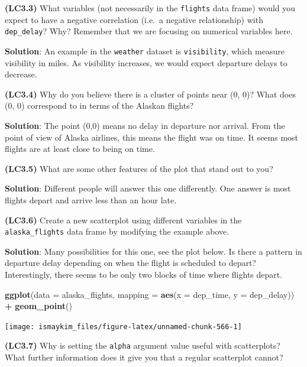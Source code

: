 \documentclass[12pt, krantz2,]{krantz}
\makeatletter
\newenvironment{Shaded}{\begin{snugshade}}{\end{snugshade}}
\newcommand{\DataTypeTok}[1]{\textcolor[rgb]{0.27,0.27,0.27}{#1}}
\newcommand{\KeywordTok}[1]{\textcolor[rgb]{0.27,0.27,0.27}{\textbf{#1}}}
\newcommand{\NormalTok}[1]{#1}
\newcommand{\OperatorTok}[1]{\textcolor[rgb]{0.43,0.43,0.43}{\textbf{#1}}}
\newcommand{\StringTok}[1]{\textcolor[rgb]{0.5,0.5,0.5}{#1}}
\newenvironment{kframe}{%
\medskip{}
\setlength{\fboxsep}{.8em}
 \def\at@end@of@kframe{}%
 \ifinner\ifhmode%
  \def\at@end@of@kframe{\end{minipage}}%
  \begin{minipage}{\columnwidth}%
 \fi\fi%
 \def\FrameCommand##1{\hskip\@totalleftmargin \hskip-\fboxsep
 \colorbox{shadecolor}{##1}\hskip-\fboxsep
     \hskip-\linewidth \hskip-\@totalleftmargin \hskip\columnwidth}%
 \MakeFramed {\advance\hsize-\width
   \@totalleftmargin\z@ \linewidth\hsize
   \@setminipage}}%
 {\par\unskip\endMakeFramed%
 \at@end@of@kframe}
\renewenvironment{Shaded}{\begin{kframe}}{\end{kframe}}
\makeatother
\begin{document}
\textbf{(LC3.3)} What variables (not necessarily in the \texttt{flights} data frame) would you expect to have a negative correlation (i.e.~a negative relationship) with \texttt{dep\_delay}? Why? Remember that we are focusing on numerical variables here.

\textbf{Solution}: An example in the \texttt{weather} dataset is \texttt{visibility}, which measure visibility in miles. As visibility increases, we would expect departure delays to decrease.

\textbf{(LC3.4)} Why do you believe there is a cluster of points near (0, 0)? What does (0, 0) correspond to in terms of the Alaskan flights?

\textbf{Solution}: The point (0,0) means no delay in departure nor arrival. From the point of view of Alaska airlines, this means the flight was on time. It seems most flights are at least close to being on time.

\textbf{(LC3.5)} What are some other features of the plot that stand out to you?

\textbf{Solution}: Different people will answer this one differently. One answer is most flights depart and arrive less than an hour late.

\textbf{(LC3.6)} Create a new scatterplot using different variables in the \texttt{alaska\_flights} data frame by modifying the example above.

\textbf{Solution}: Many possibilities for this one, see the plot below. Is there a pattern in departure delay depending on when the flight is scheduled to depart? Interestingly, there seems to be only two blocks of time where flights depart.

\begin{Shaded}
\begin{Highlighting}[]
\KeywordTok{ggplot}\NormalTok{(}\DataTypeTok{data =}\NormalTok{ alaska_flights, }\DataTypeTok{mapping =} \KeywordTok{aes}\NormalTok{(}\DataTypeTok{x =}\NormalTok{ dep_time, }\DataTypeTok{y =}\NormalTok{ dep_delay)) }\OperatorTok{+}
\StringTok{  }\KeywordTok{geom_point}\NormalTok{()}
\end{Highlighting}
\end{Shaded}

\begin{center}\texttt{[image: ismaykim\_files/figure-latex/unnamed-chunk-566-1]} \end{center}

\textbf{(LC3.7)} Why is setting the \texttt{alpha} argument value useful with scatterplots? What further information does it give you that a regular scatterplot cannot?
\end{document}
